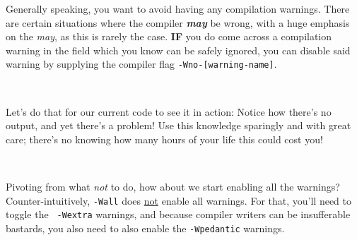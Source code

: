 Generally speaking, you want to avoid having any compilation warnings.
There are certain situations where the compiler \textbf{\emph{may}} be
wrong, with a huge emphasis on the \emph{may}, as this is rarely the
case.  \textbf{IF} you do come across a compilation warning in the field
which you know can be safely ignored, you can disable said warning by
supplying the compiler flag \texttt{-Wno-[warning-name]}.

\

\noindent
Let's do that for our current code to see it in action:
\noindent
Notice how there's no output, and yet there's a problem!  Use this
knowledge sparingly and with great care; there's no knowing how many
hours of your life this could cost you!

\

\noindent
Pivoting from what \emph{not} to do, how about we start enabling all the
warnings?  Counter-intuitively, \texttt{-Wall} does \underline{not}
enable all warnings.  For that, you'll need to toggle the \texttt{%
-Wextra} warnings, and because compiler writers can be insufferable
bastards, you also need to also enable the \texttt{-Wpedantic} warnings.
